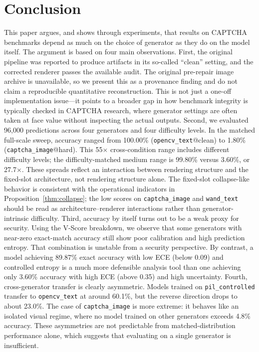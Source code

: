 \documentclass[pdflatex,sn-mathphys-num,iicol]{sn-jnl}
\begin{document}
\section{Conclusion}
This paper argues, and shows through experiments, that results on CAPTCHA benchmarks depend as much on the choice of generator as they do on the model itself. The argument is based on four main observations.
First, the original pipeline was reported to produce artifacts in its so-called
``clean'' setting, and the corrected renderer passes the available audit. The
original pre-repair image archive is unavailable, so we present this as a
provenance finding and do not claim a reproducible quantitative reconstruction. This is not just a one-off implementation issue---it points to a broader gap in how benchmark integrity is typically checked in CAPTCHA research, where generator settings are often taken at face value without inspecting the actual outputs.
Second, we evaluated 96,000 predictions across four generators and four difficulty levels. In the matched full-scale sweep, accuracy ranged from 100.00\% (\texttt{opencv\_text}@clean) to 1.80\% (\texttt{captcha\_image}@hard). This 55$\times$ cross-condition range includes different difficulty levels; the difficulty-matched medium range is 99.80\% versus 3.60\%, or 27.7$\times$. These spreads reflect an interaction between rendering structure and the fixed-slot architecture, not rendering structure alone. The fixed-slot collapse-like behavior is consistent with the operational
indicators in Proposition~\ref{thm:collapse}; the low scores on
\texttt{captcha\_image} and \texttt{wand\_text} should be read as architecture--renderer
interactions rather than generator-intrinsic difficulty.
Third, accuracy by itself turns out to be a weak proxy for security. Using the V-Score breakdown, we observe that some generators with near-zero exact-match accuracy still show poor calibration and high prediction entropy. That combination is unstable from a security perspective. By contrast, a model achieving 89.87\% exact accuracy with low ECE (below 0.09) and controlled entropy is a much more defensible analysis tool than one achieving only 3.60\% accuracy with high ECE (above 0.35) and high uncertainty.
Fourth, cross-generator transfer is clearly asymmetric. Models trained on \texttt{pil\_controlled} transfer to \texttt{opencv\_text} at around 60.1\%, but the reverse direction drops to about 23.0\%. The case of \texttt{captcha\_image} is more extreme: it behaves like an isolated visual regime, where no model trained on other generators exceeds 4.8\% accuracy. These asymmetries are not predictable from matched-distribution performance alone, which suggests that evaluating on a single generator is insufficient.
\end{document}
